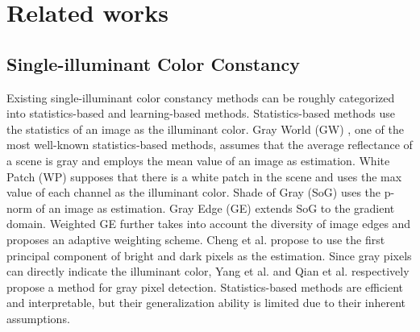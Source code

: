 \section{Related works}
\label{sec2:related works}

\subsection{Single-illuminant Color Constancy}
\label{sec2.1:Single-illuminant Color Constancy}
Existing single-illuminant color constancy methods can be roughly categorized into statistics-based and learning-based methods. Statistics-based methods use the statistics of an image as the illuminant color. Gray World (GW) \cite{Buchsbaum1980a}, one of the most well-known statistics-based methods, assumes that the average reflectance of a scene is gray and employs the mean value of an image as estimation. White Patch (WP) \cite{barnard_comparison_2002} supposes that there is a white patch in the scene and uses the max value of each channel as the illuminant color. Shade of Gray (SoG) \cite{finlayson_shades_2004} uses the p-norm of an image as estimation. Gray Edge (GE) \cite{VandeWeijer2007c} extends SoG
to the gradient domain. Weighted GE \cite{gijsenij_improving_2012} further takes into account the diversity of image edges and proposes an adaptive weighting scheme. Cheng et al. \cite{Cheng2014a} propose to use the first principal component of bright and dark pixels as the estimation. Since gray pixels can directly indicate the illuminant color, Yang et al. \cite{Yang2015} and Qian et al. \cite{qian_finding_2019} respectively propose a method for gray pixel detection. Statistics-based methods are efficient and interpretable, but their generalization ability is limited due to their inherent assumptions.

